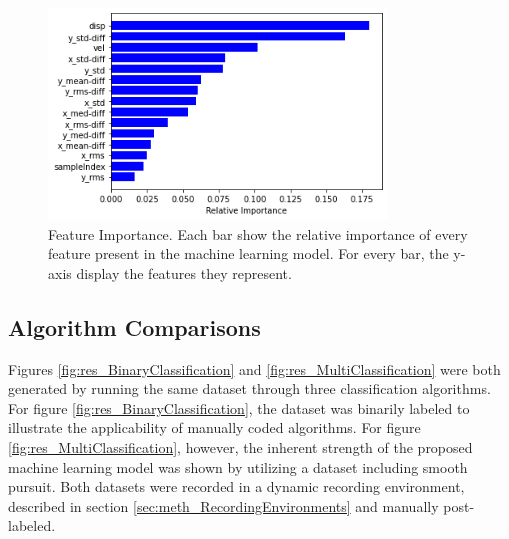 \begin{figure}[h]
    \centering
    \includegraphics[width=0.8\textwidth]{Images/Classification/FeatureImportance.png}
    \caption{Feature Importance. Each bar show the relative importance of every feature present in the machine learning model. For every bar, the y-axis display the features they represent.}
    \label{fig:res_FeatureImportance}
\end{figure}

\subsection{Algorithm Comparisons}
    
Figures \ref{fig:res_BinaryClassification} and \ref{fig:res_MultiClassification} were both generated by running the same dataset through three classification algorithms. For figure \ref{fig:res_BinaryClassification}, the dataset was binarily labeled to illustrate the applicability of manually coded algorithms. For figure \ref{fig:res_MultiClassification}, however, the inherent strength of the proposed machine learning model was shown by utilizing a dataset including smooth pursuit. Both datasets were recorded in a dynamic recording environment, described in section \ref{sec:meth_RecordingEnvironments} and manually post-labeled. 

